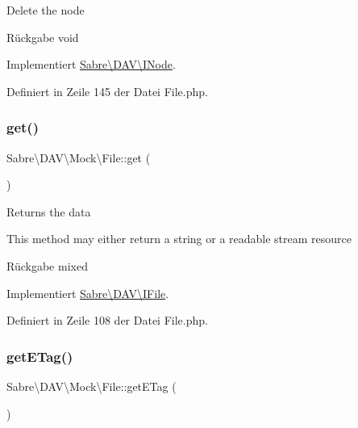 Delete the node

\begin{DoxyReturn}{Rückgabe}
void 
\end{DoxyReturn}


Implementiert \mbox{\hyperlink{interface_sabre_1_1_d_a_v_1_1_i_node_a72cd0ee4e36dfced2b0412d14dbd73e6}{Sabre\textbackslash{}\+D\+A\+V\textbackslash{}\+I\+Node}}.



Definiert in Zeile 145 der Datei File.\+php.

\mbox{\label{class_sabre_1_1_d_a_v_1_1_mock_1_1_file_a680bfbc05027d3b00e3dc7198e6d4172}} 
\subsubsection{\texorpdfstring{get()}{get()}}
{\footnotesize\ttfamily Sabre\textbackslash{}\+D\+A\+V\textbackslash{}\+Mock\textbackslash{}\+File\+::get (\begin{DoxyParamCaption}{ }\end{DoxyParamCaption})}

Returns the data

This method may either return a string or a readable stream resource

\begin{DoxyReturn}{Rückgabe}
mixed 
\end{DoxyReturn}


Implementiert \mbox{\hyperlink{interface_sabre_1_1_d_a_v_1_1_i_file_a3102812af0567c3cfd9cd6c20104bd27}{Sabre\textbackslash{}\+D\+A\+V\textbackslash{}\+I\+File}}.



Definiert in Zeile 108 der Datei File.\+php.

\mbox{\label{class_sabre_1_1_d_a_v_1_1_mock_1_1_file_a9654d2fd0b81900d1c75bf3d7129d0be}} 
\subsubsection{\texorpdfstring{get\+E\+Tag()}{getETag()}}
{\footnotesize\ttfamily Sabre\textbackslash{}\+D\+A\+V\textbackslash{}\+Mock\textbackslash{}\+File\+::get\+E\+Tag (\begin{DoxyParamCaption}{ }\end{DoxyParamCaption})}

